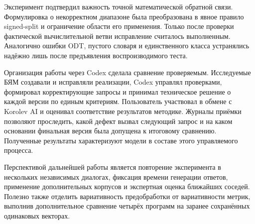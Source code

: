 \documentclass[a4paper,12pt]{extreport}
\begin{document}
Эксперимент подтвердил важность точной математической обратной связи. Формулировка о некорректном диапазоне была преобразована в явное правило signed-split и ограничение области его применения. Только после проверки фактической вычислительной ветви исправление считалось выполненным. Аналогично ошибки ODT, пустого словаря и единственного класса устранялись надёжно лишь после предъявления воспроизводимого теста.

Организация работы через Codex сделала сравнение проверяемым. Исследуемые БЯМ создавали и исправляли реализации, Codex управлял проверками, формировал корректирующие запросы и принимал техническое решение о каждой версии по единым критериям. Пользователь участвовал в обмене с Korolev AI и оценивал соответствие результатов методике. Журналы приёмки позволяют проследить, какой дефект вызвал следующий запрос и на каком основании финальная версия была допущена к итоговому сравнению. Полученные результаты характеризуют модели в составе этого управляемого процесса.

\begin{samepage}
Перспективой дальнейшей работы является повторение эксперимента в нескольких независимых диалогах, фиксация времени генерации ответов, применение дополнительных корпусов и экспертная оценка ближайших соседей. Полезно также отделить вариативность предобработки от вариативности метрик, выполнив дополнительное сравнение четырёх программ на заранее сохранённых одинаковых векторах.
\par
\end{samepage}
\end{document}
